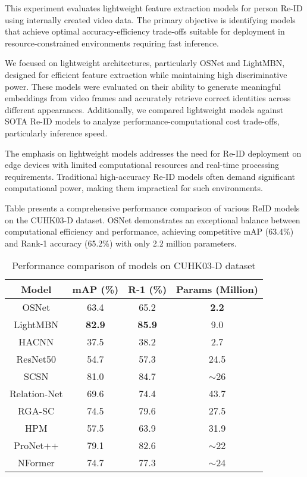 This experiment evaluates lightweight feature extraction models for person Re-ID using internally created video data. The primary objective is identifying models that achieve optimal accuracy-efficiency trade-offs suitable for deployment in resource-constrained environments requiring fast inference.

We focused on lightweight architectures, particularly OSNet and LightMBN, designed for efficient feature extraction while maintaining high discriminative power. These models were evaluated on their ability to generate meaningful embeddings from video frames and accurately retrieve correct identities across different appearances. Additionally, we compared lightweight models against SOTA Re-ID models to analyze performance-computational cost trade-offs, particularly inference speed.

The emphasis on lightweight models addresses the need for Re-ID deployment on edge devices with limited computational resources and real-time processing requirements. Traditional high-accuracy Re-ID models often demand significant computational power, making them impractical for such environments.

Table presents a comprehensive performance comparison of various ReID models on the CUHK03-D dataset. OSNet demonstrates an exceptional balance between computational efficiency and performance, achieving competitive mAP (63.4\%) and Rank-1 accuracy (65.2\%) with only 2.2 million parameters.

\begin{table}[ht]
\centering
\caption{Performance comparison of models on CUHK03-D dataset}
\begin{tabular}{|c|c|c|c|}
\hline
\textbf{Model} & \textbf{mAP (\%)} & \textbf{R-1 (\%)} & \textbf{Params (Million)} \\ 
\hline
OSNet \cite{zhou2019omniscalefeaturelearningperson} & 63.4 & 65.2 & \textbf{2.2} \\ 
LightMBN \cite{Herzog_2021} & \textbf{82.9} & \textbf{85.9} & 9.0 \\ 
HACNN \cite{li2018harmoniousattentionnetworkperson} & 37.5 & 38.2 & 2.7 \\ 
ResNet50 \cite{he2015deepresiduallearningimage} & 54.7 & 57.3 & 24.5 \\ 
SCSN \cite{Chen_2020_CVPR} & 81.0 & 84.7 & $\sim$26 \\ 
Relation-Net \cite{park2019relationnetworkpersonreidentification} & 69.6 & 74.4 & 43.7 \\ 
RGA-SC \cite{zhang2020relationawareglobalattentionperson} & 74.5 & 79.6 & 27.5 \\ 
HPM \cite{fu2018horizontalpyramidmatchingperson} & 57.5 & 63.9 & 31.9 \\ 
ProNet++ \cite{wang2023rethinkingpersonreidentificationprojectiononprototypes} & 79.1 & 82.6 & $\sim$22 \\ 
NFormer \cite{wang2022nformerrobustpersonreidentification} & 74.7 & 77.3 & $\sim$24 \\ 
\hline
\end{tabular}
\label{tab:cuhk03_comparison}
\end{table}


